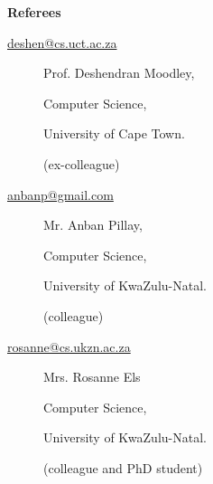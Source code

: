 \begin{description}\item[] \begin{description}\item[] {\bf  Referees  }
\begin{description}
\item[]
\item[]
\item[]

\item[\url{deshen@cs.uct.ac.za}] 
 \item[] Prof. Deshendran Moodley, 
 \item[] Computer Science, 
 \item[] University of Cape Town.
\item[] (ex-colleague)
\item[]

\item[\url{anbanp@gmail.com}] 
 \item[] Mr. Anban Pillay,
 \item[] Computer Science,
 \item[] University of KwaZulu-Natal.
 \item[] (colleague) 
\item[]



\item[\url{rosanne@cs.ukzn.ac.za}] 
 \item[] Mrs. Rosanne Els
 \item[] Computer Science,
 \item[] University of KwaZulu-Natal.
 \item[]  (colleague and PhD student) 
\item[]

%


 \end{description}
\end{description}
\end{description}

